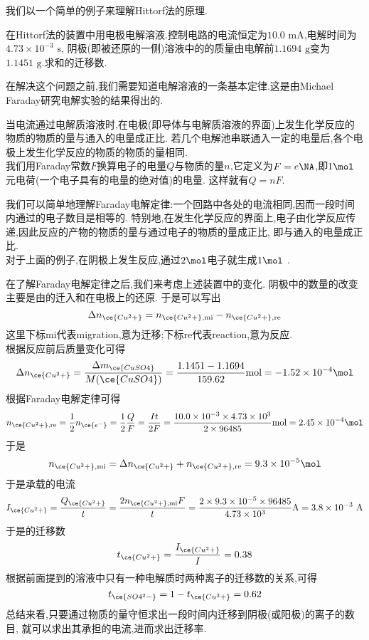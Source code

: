 \documentclass{ctexart}
\begin{document}
\indent 我们以一个简单的例子来理解Hittorf法的原理.
\begin{exercise}[E.6A.1]
    在Hittorf法的装置中用电极电解溶液.控制电路的电流恒定为$10.0\text{ mA}$,电解时间为$4.73\times10^{-3}\text{ s}$,%
    阴极(即被还原的一侧)溶液中的的质量由电解前$1.1694\text{ g}$变为$1.1451\text{ g}$.求和的迁移数.
\end{exercise}
在解决这个问题之前,我们需要知道电解溶液的一条基本定律.这是由Michael Faraday研究电解实验的结果得出的.
\begin{theorem}[6A.2.3 Faraday电解定律]
    当电流通过电解质溶液时,在电极(即导体与电解质溶液的界面)上发生化学反应的物质的物质的量与通入的电量成正比.
    若几个电解池串联通入一定的电量后,各个电极上发生化学反应的物质的物质的量相同.\\
    我们用Faraday常数$F$换算电子的电量$Q$与物质的量$n$,它定义为$F=e\NA$,即$1\mol$元电荷(一个电子具有的电量的绝对值)的电量.%
    这样就有$Q=nF$.
\end{theorem}
我们可以简单地理解Faraday电解定律:一个回路中各处的电流相同,因而一段时间内通过的电子数目是相等的.%
特别地,在发生化学反应的界面上,电子由化学反应传递,因此反应的产物的物质的量与通过电子的物质的量成正比,%
即与通入的电量成正比.\\
\indent 对于上面的例子,在阴极上发生反应,通过$2\mol$电子就生成$1\mol$ .
\begin{solution}
    在了解Faraday电解定律之后,我们来考虑上述装置中的变化.%
    阴极中的数量的改变主要是由的迁入和在电极上的还原.%
    于是可以写出
    \[\Delta n_{\ce{Cu^2+}}=n_{\ce{Cu^2+},\text{mi}}-n_{\ce{Cu^2+},\text{re}}\]
    这里下标mi代表migration,意为迁移;下标re代表reaction,意为反应.\\
    根据反应前后质量变化可得
    \[\Delta n_{\ce{Cu^2+}}
    =\dfrac{\Delta m_{\ce{CuSO4}}}{M(\ce{CuSO4})}
    =\dfrac{1.1451-1.1694}{159.62}\text{mol}
    =-1.52\times10^{-4}\mol\]
    根据Faraday电解定律可得
    \[n_{\ce{Cu^2+},\text{re}}
    =\dfrac12n_{\ce{e^-}}
    =\dfrac12\dfrac{Q}{F}
    =\dfrac{It}{2F}
    =\dfrac{10.0\times10^{-3}\times4.73\times10^{3}}{2\times96485}\text{mol}
    =2.45\times10^{-4}\mol\]
    于是
    \[n_{\ce{Cu^2+},\text{mi}}
    =\Delta n_{\ce{Cu^2+}}+n_{\ce{Cu^2+},\text{re}}
    =9.3\times10^{-5}\mol\]
    于是承载的电流
    \[I_{\ce{Cu^2+}}
    =\dfrac{Q_{\ce{Cu^2+}}}{t}
    =\dfrac{2n_{\ce{Cu^2+},\text{mi}}F}{t}
    =\dfrac{2\times9.3\times10^{-5}\times96485}{4.73\times10^3}\text{A}
    =3.8\times10^{-3}\text{ A}\]
    于是的迁移数
    \[t_{\ce{Cu^2+}}=\dfrac{I_{\ce{Cu^2+}}}{I}=0.38\]
    根据前面提到的溶液中只有一种电解质时两种离子的迁移数的关系,可得
    \[t_{\ce{SO4^2-}}=1-t_{\ce{Cu^2+}}=0.62\]
    总结来看,只要通过物质的量守恒求出一段时间内迁移到阴极(或阳极)的离子的数目,%
    就可以求出其承担的电流,进而求出迁移率.
\end{solution}
\end{document}
